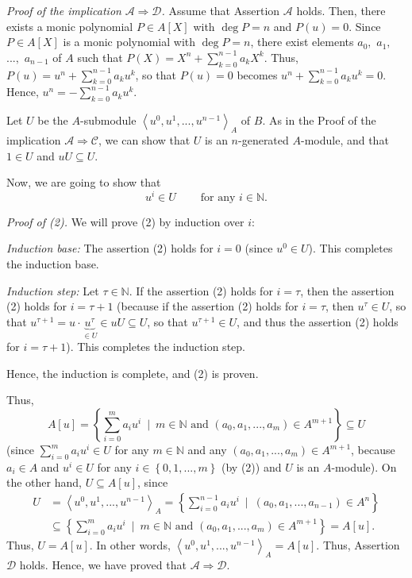 \documentclass[12pt,final,notitlepage,onecolumn]{article}%
\begin{document}
\textit{Proof of the implication }$\mathcal{A}\Longrightarrow\mathcal{D}%
$\textit{.} Assume that Assertion $\mathcal{A}$ holds. Then, there exists a
monic polynomial $P\in A\left[  X\right]  $ with $\deg P=n$ and $P\left(
u\right)  =0$. Since $P\in A\left[  X\right]  $ is a monic polynomial with
$\deg P=n$, there exist elements $a_{0},$ $a_{1},$ $...,$ $a_{n-1}$ of $A$
such that $P\left(  X\right)  =X^{n}+\sum\limits_{k=0}^{n-1}a_{k}X^{k}$. Thus,
$P\left(  u\right)  =u^{n}+\sum\limits_{k=0}^{n-1}a_{k}u^{k}$, so that
$P\left(  u\right)  =0$ becomes $u^{n}+\sum\limits_{k=0}^{n-1}a_{k}u^{k}=0$.
Hence, $u^{n}=-\sum\limits_{k=0}^{n-1}a_{k}u^{k}$.

Let $U$ be the $A$-submodule $\left\langle u^{0},u^{1},...,u^{n-1}%
\right\rangle _{A}$ of $B$. As in the Proof of the implication $\mathcal{A}%
\Longrightarrow\mathcal{C}$, we can show that $U$ is an $n$-generated
$A$-module, and that $1\in U$ and $uU\subseteq U$.

Now, we are going to show that
\begin{equation}
u^{i}\in U\ \ \ \ \ \ \ \ \ \ \text{for any }i\in\mathbb{N}. \label{2}%
\end{equation}


\textit{Proof of (2).} We will prove (2) by induction over $i$:

\textit{Induction base:} The assertion (2) holds for $i=0$ (since $u^{0}\in
U$). This completes the induction base.

\textit{Induction step:} Let $\tau\in\mathbb{N}$. If the assertion (2) holds
for $i=\tau$, then the assertion (2) holds for $i=\tau+1$ (because if the
assertion (2) holds for $i=\tau$, then $u^{\tau}\in U$, so that $u^{\tau
+1}=u\cdot\underbrace{u^{\tau}}_{\in U}\in uU\subseteq U$, so that $u^{\tau
+1}\in U$, and thus the assertion (2) holds for $i=\tau+1$). This completes
the induction step.

Hence, the induction is complete, and (2) is proven.

Thus,%
\[
A\left[  u\right]  =\left\{  \sum\limits_{i=0}^{m}a_{i}u^{i}\ \mid
\ m\in\mathbb{N}\text{ and }\left(  a_{0},a_{1},...,a_{m}\right)  \in
A^{m+1}\right\}  \subseteq U
\]
(since $\sum\limits_{i=0}^{m}a_{i}u^{i}\in U$ for any $m\in\mathbb{N}$ and any
$\left(  a_{0},a_{1},...,a_{m}\right)  \in A^{m+1}$, because $a_{i}\in A$ and
$u^{i}\in U$ for any $i\in\left\{  0,1,...,m\right\}  $ (by (2)) and $U$ is an
$A$-module). On the other hand, $U\subseteq A\left[  u\right]  $, since%
\begin{align*}
U  &  =\left\langle u^{0},u^{1},...,u^{n-1}\right\rangle _{A}=\left\{
\sum\limits_{i=0}^{n-1}a_{i}u^{i}\ \mid\ \left(  a_{0},a_{1},...,a_{n-1}%
\right)  \in A^{n}\right\} \\
&  \subseteq\left\{  \sum\limits_{i=0}^{m}a_{i}u^{i}\ \mid\ m\in
\mathbb{N}\text{ and }\left(  a_{0},a_{1},...,a_{m}\right)  \in A^{m+1}%
\right\}  =A\left[  u\right]  .
\end{align*}
Thus, $U=A\left[  u\right]  $. In other words, $\left\langle u^{0}%
,u^{1},...,u^{n-1}\right\rangle _{A}=A\left[  u\right]  $. Thus, Assertion
$\mathcal{D}$ holds. Hence, we have proved that $\mathcal{A}\Longrightarrow
\mathcal{D}$.
\end{document}
